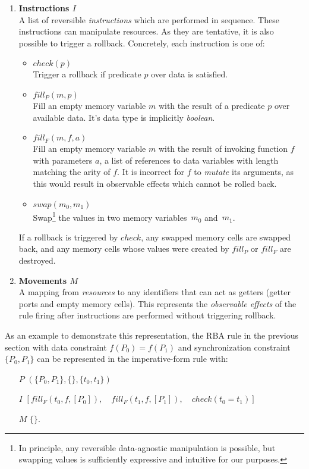 \begin{enumerate}
	\item \textbf{Instructions $I$}\\
	A list of reversible \textit{instructions} which are performed in sequence. These instructions can manipulate resources. As they are tentative, it is also possible to trigger a rollback. Concretely, each instruction is one of:
	\begin{itemize}
		\item $check(p)$\\
		Trigger a rollback if predicate $p$ over data is satisfied.
		\item $fill_P(m, p)$\\Fill an empty memory variable $m$ with the result of a predicate $p$ over available data. It's data type is implicitly \textit{boolean}.
		\item $fill_F(m, f, a)$\\
		Fill an empty memory variable $m$ with the result of invoking function $f$ with parameters $a$, a list of references to data variables with length matching the arity of $f$. It is incorrect for $f$ to \textit{mutate} its arguments, as this would result in observable effects which cannot be rolled back.
		\item $swap(m_0,m_1)$\\
		Swap\footnote{In principle, any reversible data-agnostic manipulation is possible, but swapping values is sufficiently expressive and intuitive for our purposes.} the values in two memory variables~$m_0$ and~$m_1$.
	\end{itemize}
	If a rollback is triggered by $check$, any swapped memory cells are swapped back, and any memory cells whose values were created by $fill_P$ or $fill_F$ are destroyed.
	
	\item \textbf{Movements $M$}\\
	A mapping from \textit{resources} to any identifiers that can act as getters (getter ports and empty memory cells). This represents the \textit{observable effects} of the rule firing after instructions are performed without triggering rollback. 
\end{enumerate}

As an example to demonstrate this representation, the RBA rule in the previous section with data constraint $f(P_0)=f(P_1)$
and synchronization constraint $\{P_0, P_1\}$ can be represented in the imperative-form rule with:
\begin{enumerate}
	\item [$P$] $(\{P_0, P_1\}, \{\}, \{t_0,t_1\})$
	\item [$I$] $[fill_F(t_0, f, [P_0]), \quad{} fill_F(t_1, f, [P_1]), \quad check(t_0 = t_1)]$
	\item [$M$] $\{\}$.
\end{enumerate}

